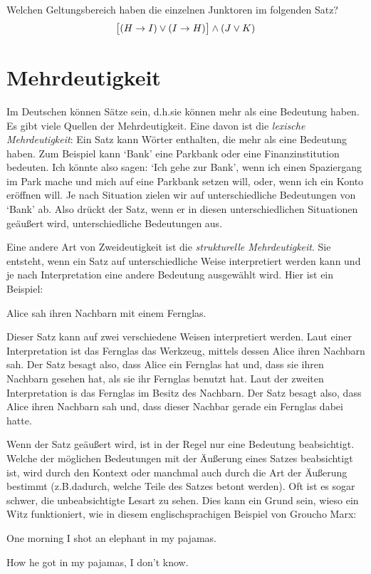 \problempart
Welchen Geltungsbereich haben die einzelnen Junktoren im folgenden Satz?
$$\bigl[(H \rightarrow I) \vee (I \rightarrow H)\bigr] \wedge (J \vee K)$$

\chapter{Mehrdeutigkeit}\label{s:AbmbiguityTFL}

Im Deutschen können Sätze  sein, d.h.\@ sie können mehr als eine Bedeutung haben. Es gibt viele Quellen der Mehrdeutigkeit. Eine davon ist die \emph{lexische Mehrdeutigkeit}: Ein Satz kann Wörter enthalten, die mehr als eine Bedeutung haben. Zum Beispiel kann `Bank' eine Parkbank oder eine Finanzinstitution bedeuten. Ich könnte also sagen: `Ich gehe zur Bank', wenn ich einen Spaziergang im Park mache und mich auf eine Parkbank setzen will, oder, wenn ich ein Konto eröffnen will.  Je nach Situation zielen wir auf unterschiedliche Bedeutungen von `Bank' ab. Also drückt der Satz, wenn er in diesen unterschiedlichen Situationen geäu{\ss}ert wird, unterschiedliche Bedeutungen aus.

Eine andere Art von Zweideutigkeit ist die \emph{strukturelle Mehrdeutigkeit}. Sie entsteht, wenn ein Satz auf unterschiedliche Weise interpretiert werden kann und je nach Interpretation eine andere Bedeutung ausgewählt wird. Hier ist ein Beispiel:
\begin{earg}
	\item[] Alice sah ihren Nachbarn mit einem Fernglas.
\end{earg}
Dieser Satz kann auf zwei verschiedene Weisen interpretiert werden. Laut einer Interpretation ist das Fernglas das Werkzeug, mittels dessen Alice ihren Nachbarn sah. Der Satz besagt also, dass Alice ein Fernglas hat und, dass sie ihren Nachbarn gesehen hat, als sie ihr Fernglas benutzt hat. Laut der zweiten Interpretation is das Fernglas im Besitz des Nachbarn. Der Satz besagt also, dass Alice ihren Nachbarn sah und, dass dieser Nachbar gerade ein Fernglas dabei hatte.

Wenn der Satz geäu{\ss}ert wird, ist in der Regel nur eine Bedeutung beabsichtigt. Welche der möglichen Bedeutungen mit der Äu{\ss}erung eines Satzes beabsichtigt ist, wird durch den Kontext oder manchmal auch durch die Art der Äu{\ss}erung bestimmt (z.B.\@ dadurch, welche Teile des Satzes betont werden). Oft ist es sogar schwer, die unbeabsichtigte Lesart zu sehen. Dies kann ein Grund sein, wieso ein Witz funktioniert, wie in diesem englischsprachigen Beispiel von Groucho Marx:
\begin{earg}
	\item[] One morning I shot an elephant in my pajamas.
	\item[] How he got in my pajamas, I don't know.
\end{earg}

